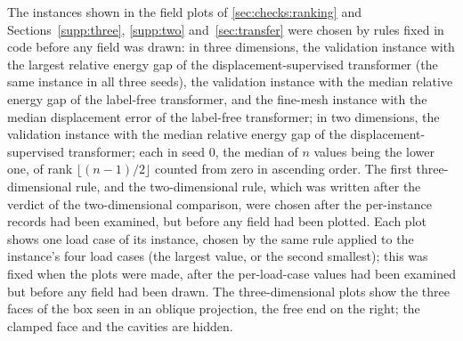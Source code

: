 The instances shown in the field plots of \cref{sec:checks:ranking} and
Sections~\ref{supp:three}, \ref{supp:two} and~\ref{sec:transfer} were chosen by rules fixed
in code before any field was drawn: in three dimensions, the validation instance with the
largest relative energy gap of the displacement-supervised transformer (the same instance in
all three seeds), the validation instance with the median relative energy gap of the
label-free transformer, and the fine-mesh instance with the median displacement error of the
label-free transformer; in two dimensions, the validation instance with the median relative
energy gap of the displacement-supervised transformer; each in seed 0, the median of $n$
values being the lower one, of rank $\lfloor(n-1)/2\rfloor$ counted from zero in ascending
order. The first three-dimensional rule, and the two-dimensional rule, which was written
after the verdict of the two-dimensional comparison, were chosen after the per-instance
records had been examined, but before any field had been plotted. Each plot shows one load
case of its instance, chosen by the same rule applied to the instance's four load cases (the
largest value, or the second smallest); this was fixed when the plots were made, after the
per-load-case values had been examined but before any field had been drawn. The
three-dimensional plots show the three faces of the box seen in an oblique projection, the
free end on the right; the clamped face and the cavities are hidden.
